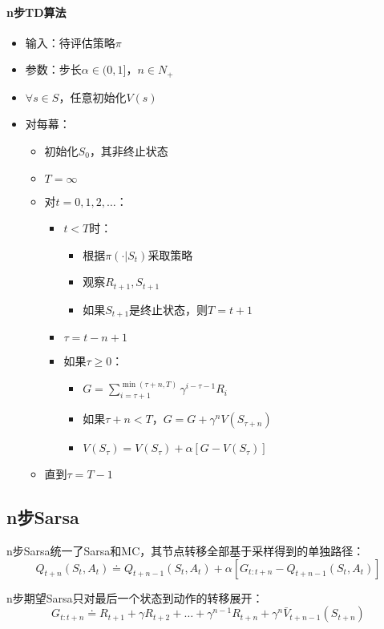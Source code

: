 \documentclass[
12pt, %
a4paper, 
oneside, %
headinclude,footinclude, %
]{scrartcl}
\begin{document}
\paragraph{n步TD算法}
\begin{itemize}
\item 输入：待评估策略$ \pi $
\item 参数：步长$ \alpha \in (0,1] $，$ n \in N_+ $
\item $ \forall s \in S $，任意初始化$ V(s) $
\item 对每幕：
\begin{itemize}
\item 初始化$ S_0 $，其非终止状态
\item $ T = \infty $
\item 对$ t = 0, 1, 2, \dots $：
\begin{itemize}
\item $ t < T $时：
\begin{itemize}
\item 根据$ \pi(\cdot|S_t) $采取策略
\item 观察$ R_{t + 1}, S_{t + 1} $
\item 如果$ S_{t + 1} $是终止状态，则$ T = t + 1 $
\end{itemize}
\item $ \tau = t - n + 1 $
\item 如果$ \tau \geq 0 $：
\begin{itemize}
\item $ G = \sum_{i = \tau + 1}^{\min(\tau + n, T)} \gamma^{i - \tau - 1}R_i $
\item 如果$ \tau + n < T $，$ G = G + \gamma^n V(S_{\tau + n}) $
\item $ V(S_{\tau}) = V(S_{\tau}) + \alpha[G - V(S_{\tau})] $
\end{itemize}
\end{itemize}
\item 直到$ \tau = T - 1 $
\end{itemize}
\end{itemize}
\subsection{n步Sarsa}
n步Sarsa统一了Sarsa和MC，其节点转移全部基于采样得到的单独路径：
$$ Q_{t + n}(S_t, A_t) \doteq Q_{t + n - 1}(S_t, A_t) + \alpha [G_{t:t + n} - Q_{t + n - 1}(S_t, A_t)] $$

n步期望Sarsa只对最后一个状态到动作的转移展开：
$$ G_{t:t + n} \doteq R_{t + 1} + \gamma R_{t + 2} + \dots + \gamma^{n - 1} R_{t + n} + \gamma^n \bar{V}_{t + n - 1}(S_{t + n}) $$
\end{document}
